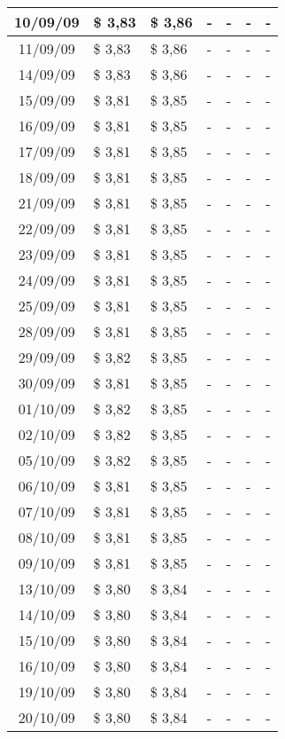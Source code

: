 \begin{center}
\begin{longtable}{|c|p{1.5cm}|p{1.5cm}|p{1.5cm}|p{1.5cm}|p{1.5cm}|p{1.5cm}|}
10/09/09 & \$ 3,83 & \$ 3,86 & - & - & - & - \\ \hline
11/09/09 & \$ 3,83 & \$ 3,86 & - & - & - & - \\ \hline
14/09/09 & \$ 3,83 & \$ 3,86 & - & - & - & - \\ \hline
15/09/09 & \$ 3,81 & \$ 3,85 & - & - & - & - \\ \hline
16/09/09 & \$ 3,81 & \$ 3,85 & - & - & - & - \\ \hline
17/09/09 & \$ 3,81 & \$ 3,85 & - & - & - & - \\ \hline
18/09/09 & \$ 3,81 & \$ 3,85 & - & - & - & - \\ \hline
21/09/09 & \$ 3,81 & \$ 3,85 & - & - & - & - \\ \hline
22/09/09 & \$ 3,81 & \$ 3,85 & - & - & - & - \\ \hline
23/09/09 & \$ 3,81 & \$ 3,85 & - & - & - & - \\ \hline
24/09/09 & \$ 3,81 & \$ 3,85 & - & - & - & - \\ \hline
25/09/09 & \$ 3,81 & \$ 3,85 & - & - & - & - \\ \hline
28/09/09 & \$ 3,81 & \$ 3,85 & - & - & - & - \\ \hline
29/09/09 & \$ 3,82 & \$ 3,85 & - & - & - & - \\ \hline
30/09/09 & \$ 3,81 & \$ 3,85 & - & - & - & - \\ \hline
01/10/09 & \$ 3,82 & \$ 3,85 & - & - & - & - \\ \hline
02/10/09 & \$ 3,82 & \$ 3,85 & - & - & - & - \\ \hline
05/10/09 & \$ 3,82 & \$ 3,85 & - & - & - & - \\ \hline
06/10/09 & \$ 3,81 & \$ 3,85 & - & - & - & - \\ \hline
07/10/09 & \$ 3,81 & \$ 3,85 & - & - & - & - \\ \hline
08/10/09 & \$ 3,81 & \$ 3,85 & - & - & - & - \\ \hline
09/10/09 & \$ 3,81 & \$ 3,85 & - & - & - & - \\ \hline
13/10/09 & \$ 3,80 & \$ 3,84 & - & - & - & - \\ \hline
14/10/09 & \$ 3,80 & \$ 3,84 & - & - & - & - \\ \hline
15/10/09 & \$ 3,80 & \$ 3,84 & - & - & - & - \\ \hline
16/10/09 & \$ 3,80 & \$ 3,84 & - & - & - & - \\ \hline
19/10/09 & \$ 3,80 & \$ 3,84 & - & - & - & - \\ \hline
20/10/09 & \$ 3,80 & \$ 3,84 & - & - & - & - \\ \hline

\end{longtable}
\end{center}
